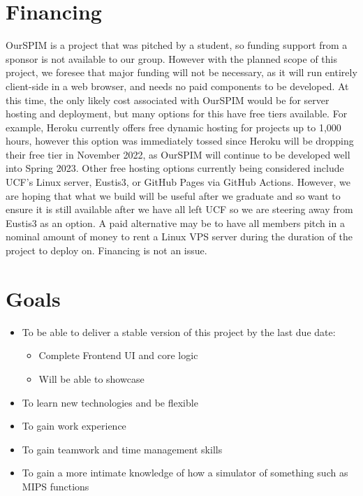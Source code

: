 \documentclass[parskip=half, fontsize=12pt]{scrartcl}
\begin{document}
\section{Financing}
OurSPIM is a project that was pitched by a student, so funding support from a sponsor is not available to our group. However with the planned scope of this project, we foresee that major funding will not be necessary, as it will run entirely client-side in a web browser, and needs no paid components to be developed. At this time, the only likely cost associated with OurSPIM would be for server hosting and deployment, but many options for this have free tiers available. For example, Heroku currently offers free dynamic hosting for projects up to 1,000 hours, however this option was immediately tossed since Heroku will be dropping their free tier in November 2022, as OurSPIM will continue to be developed well into Spring 2023. Other free hosting options currently being considered include UCF's Linux server, Eustis3, or GitHub Pages via GitHub Actions. However, we are hoping that what we build will be useful after we graduate and so want to ensure it is still available after we have all left UCF so we are steering away from Eustis3 as an option. A paid alternative may be to have all members pitch in a nominal amount of money to rent a Linux VPS server during the duration of the project to deploy on. Financing is not an issue.


\section{Goals}
\begin{itemize}
    \item To be able to deliver a stable version of this project by the last due date:
    \begin{itemize}
        \item Complete Frontend UI and core logic
        \item Will be able to showcase
    \end{itemize}
    \item To learn new technologies and be flexible
    \item To gain work experience
    \item To gain teamwork and time management skills
    \item To gain a more intimate knowledge of how a simulator of something such as MIPS functions 
\end{itemize}
\end{document}

